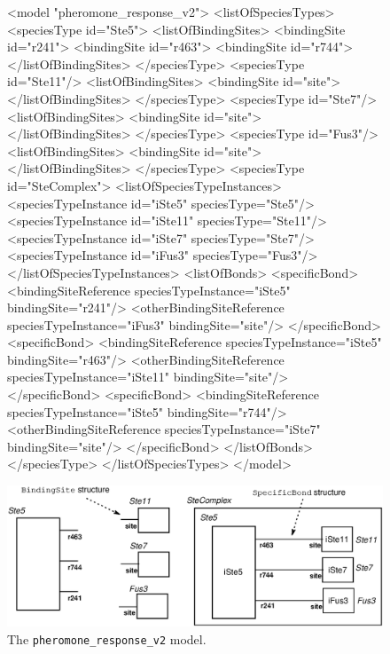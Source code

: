 \documentclass{cekarticle}
\begin{document}
\begin{figure}[h]
\begin{example}
<model "pheromone_response_v2">
    <listOfSpeciesTypes>
        <speciesType id="Ste5">
            <listOfBindingSites>
                <bindingSite id="r241">
                <bindingSite id="r463">
                <bindingSite id="r744">
            </listOfBindingSites>
        </speciesType>
        <speciesType id="Ste11"/>
            <listOfBindingSites>
                <bindingSite id="site">
            </listOfBindingSites>
        </speciesType>
        <speciesType id="Ste7"/>
            <listOfBindingSites>
                <bindingSite id="site">
            </listOfBindingSites>
        </speciesType>
        <speciesType id="Fus3"/>
            <listOfBindingSites>
                <bindingSite id="site">
            </listOfBindingSites>
        </speciesType>
        <speciesType id="SteComplex">
            <listOfSpeciesTypeInstances>
                <speciesTypeInstance id="iSte5" speciesType="Ste5"/>
                <speciesTypeInstance id="iSte11" speciesType="Ste11"/>
                <speciesTypeInstance id="iSte7" speciesType="Ste7"/>
                <speciesTypeInstance id="iFus3" speciesType="Fus3"/>
            </listOfSpeciesTypeInstances>
            <listOfBonds>
                <specificBond>
                    <bindingSiteReference speciesTypeInstance="iSte5" bindingSite="r241"/>
                    <otherBindingSiteReference
                        speciesTypeInstance="iFus3" bindingSite="site"/>
                </specificBond>
                <specificBond>
                    <bindingSiteReference speciesTypeInstance="iSte5" bindingSite="r463"/>
                    <otherBindingSiteReference
                        speciesTypeInstance="iSte11" bindingSite="site"/>
                </specificBond>
                <specificBond>
                    <bindingSiteReference speciesTypeInstance="iSte5" bindingSite="r744"/>
                    <otherBindingSiteReference
                        speciesTypeInstance="iSte7" bindingSite="site"/>
                </specificBond>
            </listOfBonds>
        </speciesType>
    </listOfSpeciesTypes>
</model>
\end{example}
  \vspace*{8pt}
  \centering
  \includegraphics[scale = 0.7]{pheromone_response_v2.eps}
  \caption{The
  \texttt{pheromone\_response\_v2}
  model.}
  \label{fig:pheromone_response_v2}
\end{figure}
\end{document}

